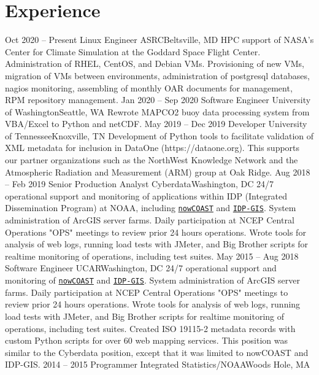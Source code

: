 \documentclass[11pt]{moderncv}  %
\begin{document}
\section{Experience}
\cventry
{Oct 2020 -- Present}
{Linux Engineer}
{ASRC}{Beltsville, MD}{}
{
HPC support of NASA's Center for Climate Simulation at the Goddard
Space Flight Center.  Administration of RHEL, CentOS, and Debian
VMs.  Provisioning of new VMs, migration of VMs between environments,
administration of postgresql databases, nagios monitoring, assembling
of monthly OAR documents for management, RPM repository management.
}
\cventry
{Jan 2020 -- Sep 2020}
{Software Engineer}
{University of Washington}{Seattle, WA}{}
{
    Rewrote MAPCO2 buoy data processing system from VBA/Excel to Python
    and netCDF.
}
\cventry
{May 2019 -- Dec 2019}
{Developer}
{University of Tennessee}{Knoxville, TN}{}
{
Development of Python tools to facilitate validation of XML metadata for inclusion in DataOne (https://dataone.org).  This supports our partner organizations such as the NorthWest Knowledge Network and the Atmospheric Radiation and Measurement (ARM) group at Oak Ridge.
}
\cventry
{Aug 2018 -- Feb 2019}
{Senior Production Analyst}
{Cyberdata}{Washington, DC}{}
{
24/7 operational support and monitoring of applications within IDP (Integrated Dissemination Program) at NOAA, including \href{https://nowcoast.noaa.gov}{\texttt{nowCOAST}} and \href{https://idpgis.ncep.noaa.gov}{\texttt{IDP-GIS}}.  System administration of ArcGIS server farms.  Daily participation at NCEP Central Operations "OPS" meetings to review prior 24 hours operations.  Wrote tools for analysis of web logs, running load tests with JMeter, and Big Brother scripts for realtime monitoring of operations, including test suites.  
}
\cventry
{May 2015 -- Aug 2018}
{Software Engineer}
{UCAR}{Washington, DC}{}
{
	24/7 operational support and monitoring of 
	\href{https://nowcoast.noaa.gov}{\texttt{nowCOAST}}
	and
	\href{https://idpgis.ncep.noaa.gov}{\texttt{IDP-GIS}}.
	System administration of ArcGIS server farms.  Daily
	participation at NCEP Central Operations "OPS" meetings to
	review prior 24 hours operations.  Wrote tools for analysis
	of web logs, running load tests with JMeter, and Big Brother
	scripts for realtime monitoring of operations, including
	test suites.  Created ISO 19115-2 metadata records with
	custom Python scripts for over 60 web mapping services.
	This position was similar to the Cyberdata position, except that
	it was limited to nowCOAST and IDP-GIS.
}
\cventry
{2014 -- 2015}
{Programmer}
{Integrated Statistics/NOAA}{Woods Hole, MA}{}
\end{document}
